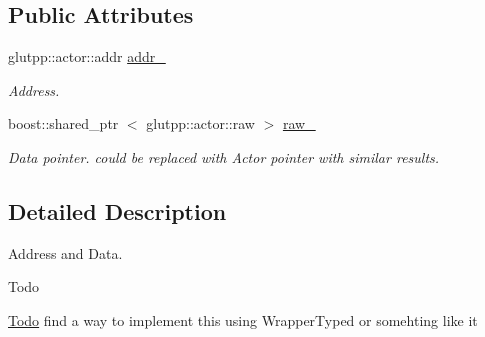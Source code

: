 \subsection*{\-Public \-Attributes}
\begin{DoxyCompactItemize}
\item 
\hypertarget{structglutpp_1_1network_1_1actor_1_1update_1_1addr__raw_a30478c5051b040fbaafb8fb138793517}{glutpp\-::actor\-::addr \hyperlink{structglutpp_1_1network_1_1actor_1_1update_1_1addr__raw_a30478c5051b040fbaafb8fb138793517}{addr\-\_\-}}\label{structglutpp_1_1network_1_1actor_1_1update_1_1addr__raw_a30478c5051b040fbaafb8fb138793517}

\begin{DoxyCompactList}\small\item\em \-Address. \end{DoxyCompactList}\item 
\hypertarget{structglutpp_1_1network_1_1actor_1_1update_1_1addr__raw_a78a532b30c2fe195ce15e420c25d45d7}{boost\-::shared\-\_\-ptr\*
$<$ glutpp\-::actor\-::raw $>$ \hyperlink{structglutpp_1_1network_1_1actor_1_1update_1_1addr__raw_a78a532b30c2fe195ce15e420c25d45d7}{raw\-\_\-}}\label{structglutpp_1_1network_1_1actor_1_1update_1_1addr__raw_a78a532b30c2fe195ce15e420c25d45d7}

\begin{DoxyCompactList}\small\item\em \-Data pointer. could be replaced with \-Actor pointer with similar results. \end{DoxyCompactList}\end{DoxyCompactItemize}


\subsection{\-Detailed \-Description}
\-Address and \-Data. 

\begin{DoxyRefDesc}{\-Todo}
\item[\hyperlink{todo__todo000007}{\-Todo}]find a way to implement this using \-Wrapper\-Typed or somehting like it \end{DoxyRefDesc}


